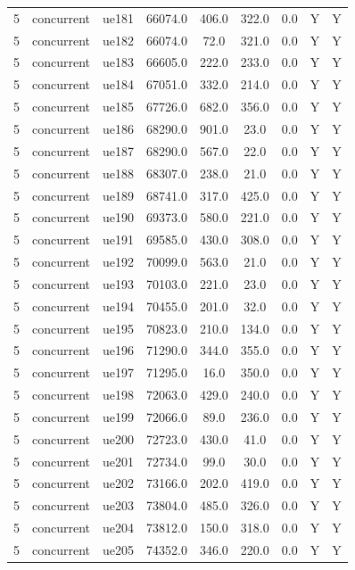 \begin{table}[ht]
\begin{tabular}{|c|c|c|c|c|c|c|c|c|}
5 & concurrent & ue181 & 66074.0 & 406.0 & 322.0 & 0.0 & Y & Y \\
5 & concurrent & ue182 & 66074.0 & 72.0 & 321.0 & 0.0 & Y & Y \\
5 & concurrent & ue183 & 66605.0 & 222.0 & 233.0 & 0.0 & Y & Y \\
5 & concurrent & ue184 & 67051.0 & 332.0 & 214.0 & 0.0 & Y & Y \\
5 & concurrent & ue185 & 67726.0 & 682.0 & 356.0 & 0.0 & Y & Y \\
5 & concurrent & ue186 & 68290.0 & 901.0 & 23.0 & 0.0 & Y & Y \\
5 & concurrent & ue187 & 68290.0 & 567.0 & 22.0 & 0.0 & Y & Y \\
5 & concurrent & ue188 & 68307.0 & 238.0 & 21.0 & 0.0 & Y & Y \\
5 & concurrent & ue189 & 68741.0 & 317.0 & 425.0 & 0.0 & Y & Y \\
5 & concurrent & ue190 & 69373.0 & 580.0 & 221.0 & 0.0 & Y & Y \\
5 & concurrent & ue191 & 69585.0 & 430.0 & 308.0 & 0.0 & Y & Y \\
5 & concurrent & ue192 & 70099.0 & 563.0 & 21.0 & 0.0 & Y & Y \\
5 & concurrent & ue193 & 70103.0 & 221.0 & 23.0 & 0.0 & Y & Y \\
5 & concurrent & ue194 & 70455.0 & 201.0 & 32.0 & 0.0 & Y & Y \\
5 & concurrent & ue195 & 70823.0 & 210.0 & 134.0 & 0.0 & Y & Y \\
5 & concurrent & ue196 & 71290.0 & 344.0 & 355.0 & 0.0 & Y & Y \\
5 & concurrent & ue197 & 71295.0 & 16.0 & 350.0 & 0.0 & Y & Y \\
5 & concurrent & ue198 & 72063.0 & 429.0 & 240.0 & 0.0 & Y & Y \\
5 & concurrent & ue199 & 72066.0 & 89.0 & 236.0 & 0.0 & Y & Y \\
5 & concurrent & ue200 & 72723.0 & 430.0 & 41.0 & 0.0 & Y & Y \\
5 & concurrent & ue201 & 72734.0 & 99.0 & 30.0 & 0.0 & Y & Y \\
5 & concurrent & ue202 & 73166.0 & 202.0 & 419.0 & 0.0 & Y & Y \\
5 & concurrent & ue203 & 73804.0 & 485.0 & 326.0 & 0.0 & Y & Y \\
5 & concurrent & ue204 & 73812.0 & 150.0 & 318.0 & 0.0 & Y & Y \\
5 & concurrent & ue205 & 74352.0 & 346.0 & 220.0 & 0.0 & Y & Y \\

\end{tabular}
\end{table}
